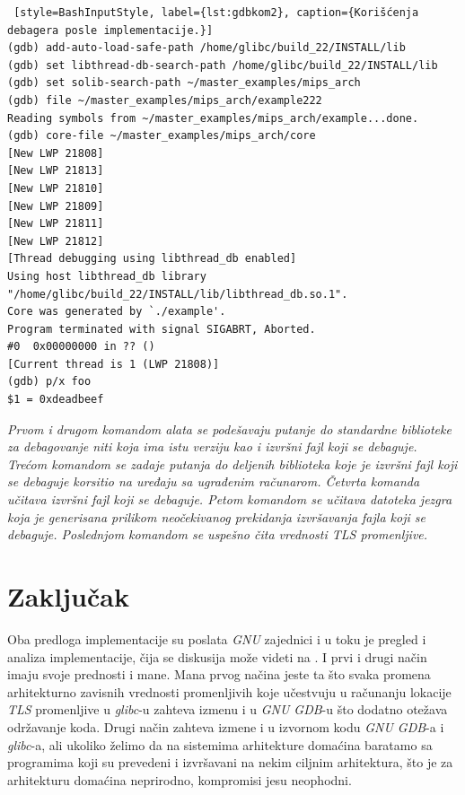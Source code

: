 \documentclass[12pt,oneside]{memoir}
\begin{document}
\begin{lstlisting} [style=BashInputStyle, label={lst:gdbkom2}, caption={Korišćenja debagera posle implementacije.}]
(gdb) add-auto-load-safe-path /home/glibc/build_22/INSTALL/lib
(gdb) set libthread-db-search-path /home/glibc/build_22/INSTALL/lib
(gdb) set solib-search-path ~/master_examples/mips_arch
(gdb) file ~/master_examples/mips_arch/example222 
Reading symbols from ~/master_examples/mips_arch/example...done.
(gdb) core-file ~/master_examples/mips_arch/core
[New LWP 21808]
[New LWP 21813]
[New LWP 21810]
[New LWP 21809]
[New LWP 21811]
[New LWP 21812]
[Thread debugging using libthread_db enabled]
Using host libthread_db library "/home/glibc/build_22/INSTALL/lib/libthread_db.so.1".
Core was generated by `./example'.
Program terminated with signal SIGABRT, Aborted.
#0  0x00000000 in ?? ()
[Current thread is 1 (LWP 21808)]
(gdb) p/x foo
$1 = 0xdeadbeef
\end{lstlisting}

\emph{Prvom i drugom komandom alata se podešavaju putanje do standardne biblioteke za debagovanje niti koja ima istu verziju kao i izvršni fajl koji se debaguje. Trećom komandom se zadaje putanja do deljenih biblioteka koje je izvršni fajl koji se debaguje korsitio na uređaju sa ugrađenim računarom. Četvrta komanda učitava izvršni fajl koji se debaguje. Petom komandom se učitava datoteka jezgra koja je generisana prilikom neočekivanog prekidanja izvršavanja fajla koji se debaguje. Poslednjom komandom se uspešno čita vrednosti \emph{TLS} promenljive.}

\chapter{Zaključak}

Oba predloga implementacije su poslata \emph{GNU} zajednici i u toku je pregled i analiza implementacije, čija se diskusija može videti na \cite{TLSPatch}. I prvi i drugi način imaju svoje prednosti i mane. Mana prvog načina jeste ta što svaka promena arhitekturno zavisnih vrednosti promenljivih koje učestvuju u računanju lokacije \emph{TLS} promenljive u \emph{glibc}-u zahteva izmenu i u \emph{GNU GDB}-u što dodatno otežava održavanje koda. Drugi način zahteva izmene i u izvornom kodu \emph{GNU GDB}-a i \emph{glibc}-a, ali ukoliko želimo da na sistemima arhitekture domaćina baratamo sa programima koji su prevedeni i izvršavani na nekim ciljnim arhitektura, što je za arhitekturu domaćina neprirodno, kompromisi jesu neophodni.
\end{document}
